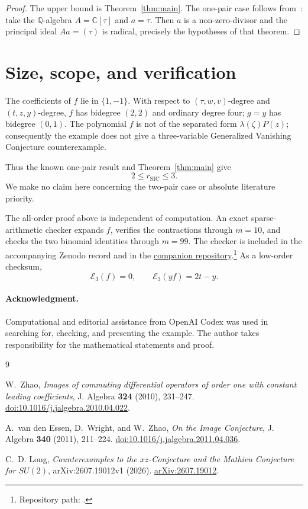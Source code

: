 \documentclass[11pt]{article}
\newcommand{\C}{\mathbb C}
\newcommand{\Eop}{\mathcal E}
\begin{document}
\begin{proof}
The upper bound is Theorem~\ref{thm:main}.  The one-pair case follows
from~\cite[Theorem 2.8]{EWZ2011}: take the \(\mathbb Q\)-algebra
\(A=\C[\tau]\) and \(a=\tau\).  Then \(a\) is a non-zero-divisor and
the principal ideal \(Aa=(\tau)\) is radical, precisely the hypotheses
of that theorem.
\end{proof}

\section{Size, scope, and verification}

The coefficients of \(f\) lie in \(\{1,-1\}\).  With respect to
\((\tau,w,v)\)-degree and \((t,z,y)\)-degree, \(f\) has bidegree
\((2,2)\) and ordinary degree four; \(g=y\) has bidegree \((0,1)\).
The polynomial \(f\) is not of the separated form
\(\lambda(\zeta)P(z)\); consequently the example does not give a
three-variable Generalized Vanishing Conjecture counterexample.

Thus the known one-pair result and Theorem~\ref{thm:main} give
\[
 2\leq r_{\mathrm{SIC}}\leq3.
\]
We make no claim here concerning the two-pair case or absolute
literature priority.

The all-order proof above is independent of computation.  An exact
sparse-arithmetic checker expands \(f\), verifies the contractions
through \(m=10\), and checks the two binomial identities through
\(m=99\).  The checker is included in the accompanying Zenodo record
and in the
\href{https://github.com/royvanrijn/jacobian-research}
{companion repository}.\footnote{Repository path:
.}
As a low-order checksum,
\[
 \Eop_3(f)=0,\qquad \Eop_3(yf)=2t-y.
\]

\paragraph{Acknowledgment.}
Computational and editorial assistance from OpenAI Codex was used in
searching for, checking, and presenting the example.  The author takes
responsibility for the mathematical statements and proof.

\begin{thebibliography}{9}
\small

W.~Zhao,
\emph{Images of commuting differential operators of order one with
constant leading coefficients},
J. Algebra \textbf{324} (2010), 231--247.
\href{https://doi.org/10.1016/j.jalgebra.2010.04.022}
{doi:10.1016/j.jalgebra.2010.04.022}.

A.~van den Essen, D.~Wright, and W.~Zhao,
\emph{On the Image Conjecture},
J. Algebra \textbf{340} (2011), 211--224.
\href{https://doi.org/10.1016/j.jalgebra.2011.04.036}
{doi:10.1016/j.jalgebra.2011.04.036}.

C.~D. Long,
\emph{Counterexamples to the \(xz\)-Conjecture and the Mathieu Conjecture
for \(SU(2)\)},
arXiv:2607.19012v1 (2026).
\href{https://arxiv.org/abs/2607.19012}
{arXiv:2607.19012}.

\end{thebibliography}
\end{document}
